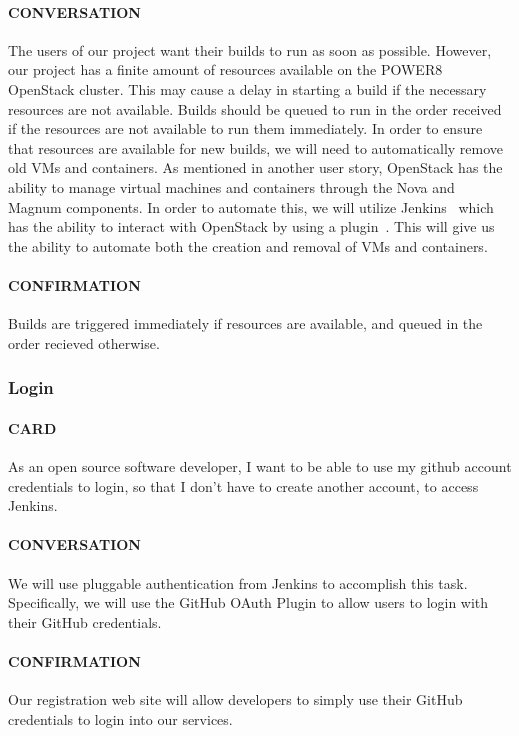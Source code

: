 \documentclass[10pt,letterpaper,onecolumn,draftclsnofoot]{IEEEtran}
\begin{document}
\paragraph{CONVERSATION}
The users of our project want their builds to run as soon as possible.
However, our project has a finite amount of resources available on the POWER8 OpenStack cluster.
This may cause a delay in starting a build if the necessary resources are not available.
Builds should be queued to run in the order received if the resources are not available to run them immediately.
In order to ensure that resources are available for new builds, we will need to automatically remove old VMs and containers.
As mentioned in another user story, OpenStack has the ability to manage virtual machines and containers through the Nova and Magnum components.
In order to automate this, we will utilize Jenkins~\cite{jenkinsmain} which has the ability to interact with OpenStack by using a plugin~\cite{jcloudsplugin}.
This will give us the ability to automate both the creation and removal of VMs and containers.
\paragraph{CONFIRMATION}
Builds are triggered immediately if resources are available, and queued in the order recieved otherwise.

\subsubsection{Login}
\paragraph{CARD}
As an open source software developer, I want to be able to use my github account credentials to login, so that I don't have to create another account, to access Jenkins.
\paragraph{CONVERSATION}
We will use pluggable authentication from Jenkins to accomplish this task. Specifically, we will use the GitHub OAuth Plugin to allow users to login with their GitHub credentials. 
\paragraph{CONFIRMATION}
Our registration web site will allow developers to simply use their GitHub credentials to login into our services.
\end{document}
